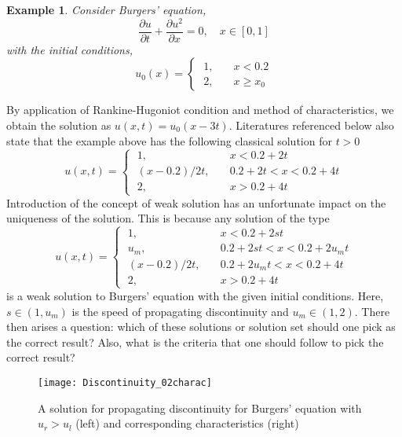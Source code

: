 \documentclass[11pt, a4paper]{report}
\newtheorem{example}{Example}[chapter] %
\begin{document}
\begin{example}
    \normalfont Consider Burgers' equation,
    \begin{equation*}
        \frac{\partial u}{\partial t} + \frac{\partial u^{2}}{\partial x} = 0, \quad x\in[0,1]
    \end{equation*}
    with the initial conditions,
    \begin{equation*}
        u_0(x) = \begin{cases}
        \; 1, & \quad x < 0.2\\[-0.5em]
        \; 2, & \quad x \geq x_0
        \end{cases}
    \end{equation*}
\end{example}
By application of Rankine-Hugoniot condition and method of characteristics, we obtain the solution as 
$u(x,t) = u_0(x-3t)$.
Literatures referenced below also state that the example above has the following classical solution for $t>0$
\begin{equation*}
    u(x, t) = \begin{cases}
    \; 1, & \quad x < 0.2+2t\\[-0.5em]
    \; (x - 0.2)/2t, & \quad 0.2+2t < x < 0.2+4t\\[-0.5em]
    \; 2, & \quad x > 0.2+4t
    \end{cases}
\end{equation*}
Introduction of the concept of weak solution has an unfortunate impact on the uniqueness of the solution. This
is because any solution of the type
\begin{equation*}
    u(x, t) = \begin{cases}
    \; 1, & \quad x < 0.2+2st\\[-0.5em]
    \; u_m, & \quad 0.2+2st < x < 0.2+2u_{m}t\\[-0.5em]
    \; (x - 0.2)/2t, & \quad 0.2+2u_{m}t < x < 0.2+4t\\[-0.5em]
    \; 2, & \quad x > 0.2+4t
    \end{cases}
\end{equation*}
is a weak solution to Burgers' equation with the given initial conditions. Here, $s\in(1,u_m)$ is the speed of 
propagating discontinuity and $u_m \in (1, 2)$. There then arises a question: which of these solutions or solution
set should one pick as the correct result? Also, what is the criteria that one should follow to pick the correct 
result?

\begin{figure}[h]
    \centering
    \texttt{[image: Discontinuity\_02charac]}
    \caption{A solution for propagating discontinuity for Burgers' equation with $u_r > u_l$ (left) and corresponding characteristics (right)}
    \label{fig:Discontinuity_02charac}
\end{figure}
\end{document}

